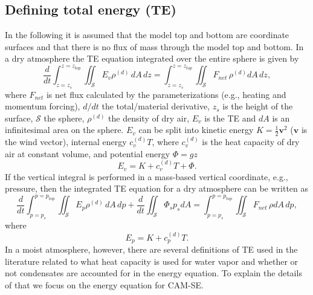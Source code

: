 \documentclass[draft,linenumbers]{agujournal}
\begin{document}
\subsection{Defining total energy (TE)}\label{sec:defE}
In the following it is assumed that the model top and bottom are coordinate surfaces and that there is no flux of mass through the model top and bottom. In a dry {\color{red}{hydrostatic}} atmosphere the TE equation integrated over the entire sphere is given by
\begin{equation}
\frac{d}{dt}\int_{z=z_s}^{z=z_{top}}\iint_{\mathcal{S}} E_v \rho^{(d)}\, dA\, dz=\int_{z=z_s}^{z=z_{top}}\iint_{\mathcal{S}} F_{net}\, \rho^{(d)} dA\, dz,
\end{equation}
\citep[e.g., ][]{K1974MWR} where $F_{net}$ is net flux calculated by the parameterizations (e.g., heating and momentum forcing), $d/dt$ the total/material derivative, $z_s$ is the height of the surface, $\mathcal{S}$ the sphere, $\rho^{(d)}$ the density of dry air, $E_v$ is the TE and $dA$ is an infinitesimal area on the sphere. $E_v$ can be split into kinetic energy $K=\frac{1}{2}\mathbf{v}^2$ ($\mathbf{v}$ is the wind vector), internal energy $c_v^{(d)}T$, where $c_v^{(d)}$ is the heat capacity of dry air at constant volume, and potential energy $\Phi=gz$
\begin{equation}
E_v=K+c_v^{(d)}T+\Phi.
\end{equation}
If the vertical integral is performed in a mass-based vertical coordinate, e.g., pressure, then the integrated TE equation for a dry atmosphere can be written as
\begin{equation}
\frac{d}{dt}\int_{p=p_s}^{p=p_{top}}\iint_{\mathcal{S}} E_p \rho^{(d)}\, dA\, dp + \frac{d}{dt}\iint_{\mathcal{S}}\Phi_sp_s dA =\int_{p=p_s}^{p=p_{top}}\iint_{\mathcal{S}} F_{net}\, \rho dA\, dp,
\end{equation}
\citep[e.g., ][]{K1974MWR} where
\begin{equation}
E_p=K+c_p^{(d)}T.
\end{equation}
In a moist atmosphere, however, there are several definitions of TE used in the literature related to what heat capacity is used for water vapor and whether or not condensates are accounted for in the energy equation. To explain the details of that we focus on the energy equation for CAM-SE.
\end{document}
